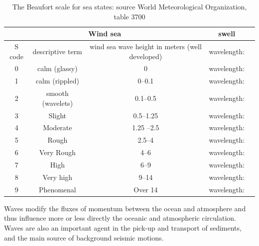 \begin{table}
  \centering
  \begin{tabular}{|c|c|c|c|c|}
\hline
    \multicolumn{3}{|c|}{Wind sea} &  swell \\
 \hline
S code & descriptive term & wind sea wave height in meters (well developed)  & wavelength: \\
0 & calm (glassy)         & 0 & wavelength: \\
1 & calm (rippled)        & 0--0.1 & wavelength: \\
2 & smooth (wavelets)     & 0.1--0.5 & wavelength: \\
3 & Slight                & 0.5--1.25   & wavelength: \\
4 & Moderate              & 1.25 --2.5 & wavelength: \\
5 & Rough                 & 2.5--4 & wavelength: \\
6 & Very Rough            & 4--6 & wavelength: \\
7 & High                  & 6--9 & wavelength: \\
8 & Very high             & 9--14 & wavelength: \\
9 & Phenomenal            & Over 14 & wavelength: \\
\hline
\end{tabular}
\caption{The Beaufort scale for sea states: source World Meteorological Organization, table 3700 \label{table_beaufort}}
\label{table_seastate}
\end{table}


Waves modify the fluxes of momentum between the ocean and atmosphere and thus influence more or less directly the oceanic and 
atmospheric circulation. Waves are also an important agent in the pick-up and transport of sediments, and 
the main source of background seismic motions. 

